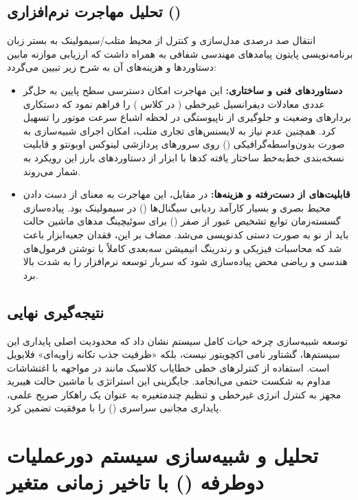 \documentclass[12pt]{report}
\begin{document}
\section{تحلیل مهاجرت نرم‌افزاری ()}
انتقال صد درصدی مدل‌سازی و کنترل از محیط متلب/سیمولینک به بستر زبان برنامه‌نویسی پایتون پیامدهای مهندسی شفافی به همراه داشت که ارزیابی موازنه مابین دستاوردها و هزینه‌های آن به شرح زیر تبیین می‌گردد:

\begin{itemize}
	\item \textbf{دستاوردهای فنی و ساختاری:} این مهاجرت امکان دسترسی سطح پایین به حل‌گر عددی معادلات دیفرانسیل غیرخطی ( در کلاس ) را فراهم نمود که دستکاری بردارهای وضعیت و جلوگیری از ناپیوستگی در لحظه اشباع سرعت موتور را تسهیل کرد. همچنین عدم نیاز به لایسنس‌های تجاری متلب، امکان اجرای شبیه‌سازی به صورت بدون‌واسطه‌گرافیکی () روی سرورهای پردازشی لینوکس اوبونتو و قابلیت نسخه‌بندی خط‌به‌خط ساختار یافته کدها با ابزار  از دستاوردهای بارز این رویکرد به شمار می‌روند.
	\item \textbf{قابلیت‌های از دست‌رفته و هزینه‌ها:} در مقابل، این مهاجرت به معنای از دست دادن محیط بصری و بسیار کارآمد ردیابی سیگنال‌ها () در سیمولینک بود. پیاده‌سازی گسسته‌زمان توابع تشخیص عبور از صفر () برای سوئیچینگ مدهای ماشین حالت باید از نو به صورت دستی کدنویسی می‌شد. مضاف بر این، فقدان جعبه‌ابزار  باعث شد که محاسبات فیزیکی و رندرینگ انیمیشن سه‌بعدی کاملاً با نوشتن فرمول‌های هندسی و ریاضی محض پیاده‌سازی شود که سربار توسعه نرم‌افزار را به شدت بالا برد.
\end{itemize}

\section{نتیجه‌گیری نهایی}
توسعه شبیه‌سازی چرخه حیات کامل سیستم  نشان داد که محدودیت اصلی پایداری این سیستم‌ها، گشتاور نامی اکچویتور نیست، بلکه «ظرفیت جذب تکانه زاویه‌ای» فلایویل است. استفاده از کنترلرهای خطی خطایاب کلاسیک مانند  در مواجهه با اغتشاشات مداوم به شکست حتمی می‌انجامد. جایگزینی این استراتژی با ماشین حالت هیبرید مجهز به کنترل انرژی غیرخطی و تنظیم چندمتغیره  به عنوان یک راهکار صریح علمی، پایداری مجانبی سراسری () را با موفقیت تضمین کرد.
\chapter{تحلیل و شبیه‌سازی سیستم دورعملیات دوطرفه () با تاخیر زمانی متغیر}
\end{document}
